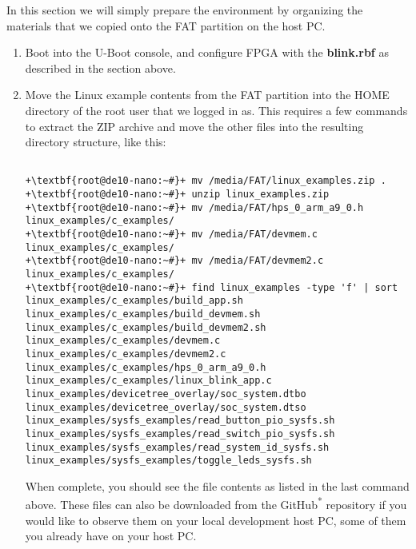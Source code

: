 \begin{flushleft}
\noindent

In this section we will simply prepare the environment by organizing the materials that we copied onto the FAT partition on the host PC.

\begin{enumerate}[
	label=\textbf{Step \arabic*.},
	leftmargin=*,
	widest={00},
	align=left]

\item Boot into the U-Boot console, and configure FPGA with the \textbf{blink.rbf} as described in the  section above.

\item Move the Linux example contents from the FAT partition into the HOME directory of the root user that we logged in as.  This requires a few commands to extract the ZIP archive and move the other files into the resulting directory structure, like this:

\begin{verbatim}

+\textbf{root@de10-nano:~#}+ mv /media/FAT/linux_examples.zip .
+\textbf{root@de10-nano:~#}+ unzip linux_examples.zip
+\textbf{root@de10-nano:~#}+ mv /media/FAT/hps_0_arm_a9_0.h linux_examples/c_examples/
+\textbf{root@de10-nano:~#}+ mv /media/FAT/devmem.c linux_examples/c_examples/
+\textbf{root@de10-nano:~#}+ mv /media/FAT/devmem2.c linux_examples/c_examples/
+\textbf{root@de10-nano:~#}+ find linux_examples -type 'f' | sort
linux_examples/c_examples/build_app.sh
linux_examples/c_examples/build_devmem.sh
linux_examples/c_examples/build_devmem2.sh
linux_examples/c_examples/devmem.c
linux_examples/c_examples/devmem2.c
linux_examples/c_examples/hps_0_arm_a9_0.h
linux_examples/c_examples/linux_blink_app.c
linux_examples/devicetree_overlay/soc_system.dtbo
linux_examples/devicetree_overlay/soc_system.dtso
linux_examples/sysfs_examples/read_button_pio_sysfs.sh
linux_examples/sysfs_examples/read_switch_pio_sysfs.sh
linux_examples/sysfs_examples/read_system_id_sysfs.sh
linux_examples/sysfs_examples/toggle_leds_sysfs.sh

\end{verbatim}

When complete, you should see the file contents as listed in the last command above.  These files can also be downloaded from the GitHub\textsuperscript{*} repository if you would like to observe them on your local development host PC, some of them you already have on your host PC.


\end{enumerate}
\end{flushleft}
